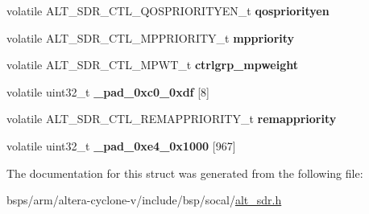 \begin{DoxyCompactItemize}
volatile A\+L\+T\+\_\+\+S\+D\+R\+\_\+\+C\+T\+L\+\_\+\+Q\+O\+S\+P\+R\+I\+O\+R\+I\+T\+Y\+E\+N\+\_\+t {\bfseries qospriorityen}
\item 
\mbox{\label{structALT__SDR__CTL__s_a12846b757abe8272de44d0dbad9c84cb}} 
volatile A\+L\+T\+\_\+\+S\+D\+R\+\_\+\+C\+T\+L\+\_\+\+M\+P\+P\+R\+I\+O\+R\+I\+T\+Y\+\_\+t {\bfseries mppriority}
\item 
\mbox{\label{structALT__SDR__CTL__s_a25d08548e16e8b4a10a77fea072d7add}} 
volatile A\+L\+T\+\_\+\+S\+D\+R\+\_\+\+C\+T\+L\+\_\+\+M\+P\+W\+T\+\_\+t {\bfseries ctrlgrp\+\_\+mpweight}
\item 
\mbox{\label{structALT__SDR__CTL__s_a07ecaf96a0b69f73642f4bcfcb3e70c8}} 
volatile uint32\+\_\+t {\bfseries \+\_\+pad\+\_\+0xc0\+\_\+0xdf} \mbox{[}8\mbox{]}
\item 
\mbox{\label{structALT__SDR__CTL__s_a8d54a38442ca4b478c63749ba7ec2198}} 
volatile A\+L\+T\+\_\+\+S\+D\+R\+\_\+\+C\+T\+L\+\_\+\+R\+E\+M\+A\+P\+P\+R\+I\+O\+R\+I\+T\+Y\+\_\+t {\bfseries remappriority}
\item 
\mbox{\label{structALT__SDR__CTL__s_a66021b4c1326460728ee8ac55248df9d}} 
volatile uint32\+\_\+t {\bfseries \+\_\+pad\+\_\+0xe4\+\_\+0x1000} \mbox{[}967\mbox{]}
\end{DoxyCompactItemize}


The documentation for this struct was generated from the following file\+:\begin{DoxyCompactItemize}
\item 
bsps/arm/altera-\/cyclone-\/v/include/bsp/socal/\mbox{\hyperlink{alt__sdr_8h}{alt\+\_\+sdr.\+h}}\end{DoxyCompactItemize}
